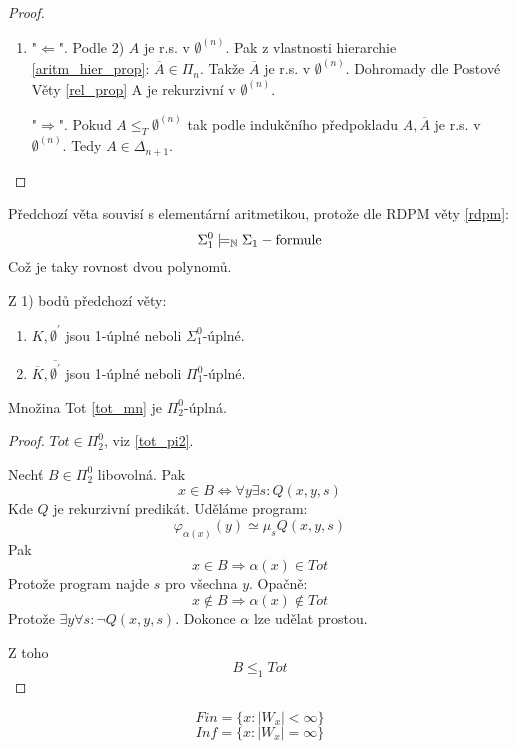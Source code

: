 \begin{proof}
\begin{enumerate}
		\item "$\Leftarrow$". Podle 2) $A$ je r.s. v $\emptyset^{(n)}$.
			Pak z vlastnosti hierarchie \cref{aritm_hier_prop}: $\overline{A} \in \Pi_n$.
			Takže $\overline{A}$ je r.s. v $\emptyset^{(n)}$.
			Dohromady dle Postové Věty \cref{rel_prop} A je rekurzivní v $\emptyset^{(n)}$.

			"$\Rightarrow$". Pokud $A \leq_T \emptyset^{(n)}$ tak podle indukčního předpokladu $A, \overline{A}$ je r.s. v $\emptyset^{(n)}$.
			Tedy $A \in \Delta_{n + 1}$.
	\end{enumerate}
\end{proof}

\begin{note}
	Předchozí věta souvisí s elementární aritmetikou, protože dle RDPM věty \cref{rdpm}:
	\[ \Sigma_1^0 \models_{\operatorname{\mathbb{N}}} \Sigma_1-\text{formule} \]
	Což je taky rovnost dvou polynomů.
\end{note}

Z 1) bodů předchozí věty:
\begin{consequence}[$K, \overline{K}$]
	\begin{enumerate}
		\item $K, \emptyset^{\prime}$ jsou 1-úplné neboli $\Sigma_1^0$-úplné.
		\item $\overline{K}, \overline{\emptyset^{\prime}}$ jsou 1-úplné neboli $\Pi_1^0$-úplné.
	\end{enumerate}
\end{consequence}

\begin{theorem}
	Množina Tot \cref{tot_mn} je $\Pi_2^0$-úplná.
\end{theorem}
\begin{proof}
	$Tot \in \Pi_2^0$, viz \cref{tot_pi2}.

	Nechť $B \in \Pi_2^0$ libovolná.
	Pak
	\[ x \in B \iff \forall y \exists s: Q(x, y, s) \]
	Kde $Q$ je rekurzivní predikát.
	Uděláme program:
	\[ \varphi_{\alpha(x)}(y) \simeq \mu_s Q(x, y, s) \]
	Pak
	\[ x \in B \Rightarrow \alpha(x) \in Tot \]
	Protože program najde $s$ pro všechna $y$.
	Opačně:
	\[ x \notin B \Rightarrow \alpha(x) \notin Tot \]
	Protože $\exists y \forall s: \neg Q(x, y, s)$.
	Dokonce $\alpha$ lze udělat prostou.

	Z toho
	\[ B \leq_1 Tot \]
\end{proof}

\begin{definition}
	\[ Fin = \{ x: |W_x| < \infty \} \]
	\[ Inf = \{ x: |W_x| = \infty \} \]
\end{definition}

